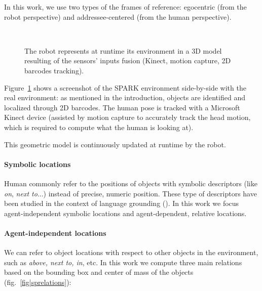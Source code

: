 In this work, we use two types of the frames of reference: egocentric (from the
robot perspective) and addressee-centered (from the human perspective).

\begin{figure}[ht!]
   \begin{center}
%
       \\ %
%
   \end{center}

   \caption{The robot represents at runtime its environment in a 3D model
   resulting of the sensors' inputs fusion (Kinect, motion capture, 2D barcodes
   tracking).}

   \label{fig|spark}

\end{figure}

Figure~\ref{fig|spark} shows a screenshot of the SPARK environment side-by-side
with the real environment: as mentioned in the introduction, objects are
identified and localized through 2D barcodes. The human pose is tracked with
a Microsoft Kinect device (assisted by motion capture to accurately track the
head motion, which is required to compute what the human is looking at).

This geometric model is continuously updated at runtime by the robot.

\paragraph{Symbolic locations}

Human commonly refer to the positions of objects with symbolic descriptors
(like \emph{on}, \emph{next to}...) instead of precise, numeric position. These
type of descriptors have been studied in the context of language grounding
(\cite{O'Keefe1999,Matuszek2010,Regier2001,Kelleher2006,Blisard2005}). In this
work we focus agent-independent symbolic locations and agent-dependent,
relative locations.

\paragraph{Agent-independent locations}

We can refer to object locations with respect to other objects in the
environment, such as \emph{above, next to, in}, etc. In this work we compute
three main relations based on the bounding box and center of mass of the
objects (fig.~\ref{fig|sprelations}): 

